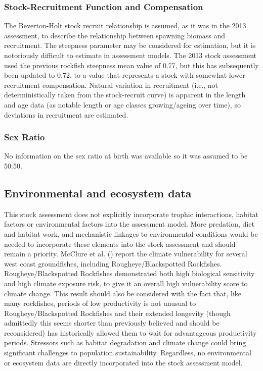\documentclass[
]{scrartcl}
\begin{document}
\subsubsection{Stock-Recruitment Function and
Compensation}\label{stock-recruitment-function-and-compensation}

The Beverton-Holt stock recruit relationship is assumed, as it was in
the 2013 assessment, to describe the relationship between spawning
biomass and recruitment. The steepness parameter may be considered for
estimation, but it is notoriously difficult to estimate in assessment
models. The 2013 stock assessment used the previous rockfish steepness
mean value of 0.77, but this has subsequently been updated to 0.72, to a
value that represents a stock with somewhat lower recruitment
compensation. Natural variation in recruitment (i.e., not
deterministically taken from the stock-recruit curve) is apparent in the
length and age data (as notable length or age classes growing/ageing
over time), so deviations in recruitment are estimated.

\subsubsection{Sex Ratio}\label{sex-ratio}

No information on the sex ratio at birth was available so it was assumed
to be 50:50.

\subsection{Environmental and ecosystem
data}\label{environmental-and-ecosystem-data}

This stock assessment does not explicitly incorporate trophic
interactions, habitat factors or environmental factors into the
assessment model. More predation, diet and habitat work, and mechanistic
linkages to environmental conditions would be needed to incorporate
these elements into the stock assessment and should remain a priority.
McClure et al. () report the
climate vulnerability for several west coast groundfishes, including
Rougheye/Blackspotted Rockfishes. Rougheye/Blackspotted Rockfishes
demonstrated both high biological sensitivity and high climate exposure
risk, to give it an overall high vulnerability score to climate change.
This result should also be considered with the fact that, like many
rockfishes, periods of low productivity is not unusual to
Rougheye/Blackspotted Rockfishes and their extended longevity (though
admittedly this seems shorter than previously believed and should be
reconsidered) has historically allowed them to wait for advantageous
productivity periods. Stressors such as habitat degradation and climate
change could bring significant challenges to population sustainability.
Regardless, no environmental or ecosystem data are directly incorporated
into the stock assessment model.
\end{document}

